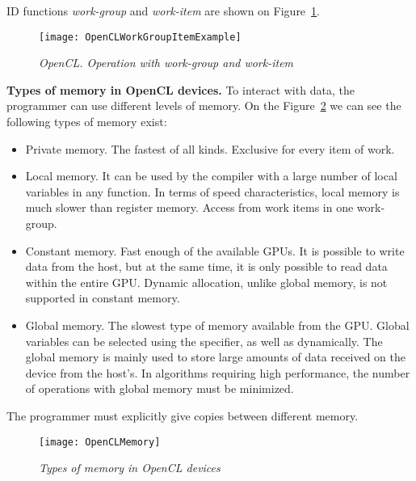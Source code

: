 {ID functions \textit{work-group} and \textit{work-item} are shown on Figure~\ref{OpenCLWorkGroupItemExample:image}.
	\begin{figure}[H]
		\texttt{[image: OpenCLWorkGroupItemExample]}
		\caption{\textit{OpenCL. Operation with work-group and work-item}}
		\label{OpenCLWorkGroupItemExample:image}
	\end{figure}
	\par\textbf{Types of memory in OpenCL devices.} To interact with data, the programmer can use different levels of memory. On the Figure~\ref{OpenCLMemory:image}  we can see the following types of memory exist:
	\begin{itemize}
		\item Private memory. The fastest of all kinds. Exclusive for every item of work.
		\item Local memory. It can be used by the compiler with a large number of local variables in any function. In terms of speed characteristics, local memory is much slower than register memory. Access from work items in one work-group.
		\item Constant memory. Fast enough of the available GPUs. It is possible to write data from the host, but at the same time, it is only possible to read data within the entire GPU. Dynamic allocation, unlike global memory, is not supported in constant memory.
		\item Global memory. The slowest type of memory available from the GPU. Global variables can be selected using the specifier, as well as dynamically. The global memory is mainly used to store large amounts of data received on the device from the host’s. In algorithms requiring high performance, the number of operations with global memory must be minimized.
	\end{itemize}	
	The programmer must explicitly give copies between different memory.
	\begin{figure}[H]
		\texttt{[image: OpenCLMemory]}
		\caption{\textit{Types of memory in OpenCL devices}}
		\label{OpenCLMemory:image}
	\end{figure}

}
